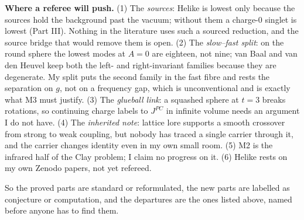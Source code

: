 \textbf{Where a referee will push.} (1) The \emph{sources}: Helike is lowest only because the sources hold the background
past the vacuum; without them a charge-$0$ singlet is lowest (Part III). Nothing in the literature uses such a sourced
reduction, and the source bridge that would remove them is open. (2) The \emph{slow--fast split}: on the round sphere
the lowest modes at $A=0$ are eighteen, not nine; van Baal and van den Heuvel keep both the left- and right-invariant
families because they are degenerate. My split puts the second family in the fast fibre and rests the separation on $g$,
not on a frequency gap, which is unconventional and is exactly what M3 must justify. (3) The \emph{glueball link}: a
squashed sphere at $t=3$ breaks rotations, so continuing charge labels to $J^{PC}$ in infinite volume needs an argument
I do not have. (4) The \emph{inherited note}: lattice lore supports a smooth crossover from strong to weak coupling, but
nobody has traced a single carrier through it, and the carrier changes identity even in my own small room. (5) M2 is the
infrared half of the Clay problem; I claim no progress on it. (6) Helike rests on my own Zenodo papers, not yet refereed.

So the proved parts are standard or reformulated, the new parts are labelled as conjecture or computation, and the
departures are the ones listed above, named before anyone has to find them.
